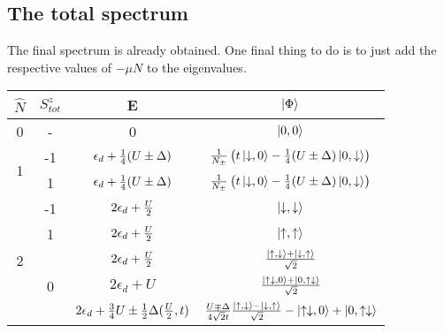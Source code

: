 \documentclass{article}
\begin{document}
\subsection{The total spectrum}
The final spectrum is already obtained. One final thing to do is to just add the respective values of \(-\mu N\) to the eigenvalues.
\begin{table}[htb]
\begin{center}
\begin{tabular}{@{}cccc@{}}
\toprule
\(\hat{N}\) & \(S_{tot}^z\) & E & \(\ket{\Phi}\)\\
\toprule
0 & - & 0 & \(\ket{0,0}\) \\ \toprule
\multirow{2}{*}{1} & -1 & \(\epsilon_d + \frac{1}{4}(U\pm\Delta)\)  & \(\frac{1}{N_\pm}\left({t\ket{\downarrow,0}-\frac{1}{4}(U\pm\Delta)\ket{0,\downarrow}}\right)\) \\

 \cmidrule(l){2-4}

& 1 & \(\epsilon_d + \frac{1}{4}(U\pm\Delta)\)  & \(\frac{1}{N_\pm}\left({t\ket{\downarrow,0}-\frac{1}{4}(U\pm\Delta)\ket{0,\downarrow}}\right)\) \\
 \toprule

\multirow{6}{*}{2}                     & -1                  & \(2\epsilon_d+\frac{U}{2}\)   & \(\ket{\downarrow,\downarrow}\)  \\
 \cmidrule(l){2-4} 
                                       & 1                   & \(2\epsilon_d+\frac{U}{2}\)   & \(\ket{\uparrow,\uparrow}\) \\
                                       \cmidrule(l){2-4} 
                                       & \multirow{3}{*}{0}  & \(2\epsilon_d+\frac{U}{2}\)   & \(\frac{\ket{\uparrow,\downarrow}+\ket{\downarrow,\uparrow}}{\sqrt{2}}\)  \\
                                        \cmidrule(l){3-4} 

                                       &                     & \(2\epsilon_d+U\)  & \(\frac{\ket{\uparrow\downarrow,0}+\ket{0,\uparrow\downarrow}}{\sqrt{2}}\)  \\
                                        \cmidrule(l){3-4} 

                                       &                     & \(2\epsilon_d+\frac{3}{4}U\pm\frac{1}{2}\Delta(\frac{U}{2},t)\)    & \(\frac{U\mp\Delta}{4\sqrt{2}t}\frac{\ket{\uparrow,\downarrow} - \ket{\downarrow,\uparrow}}{\sqrt 2}-\ket{\uparrow\downarrow,0} + \ket{0,\uparrow\downarrow}\)  \\
                                     

\end{tabular}
\end{center}
\end{table}
\end{document}
